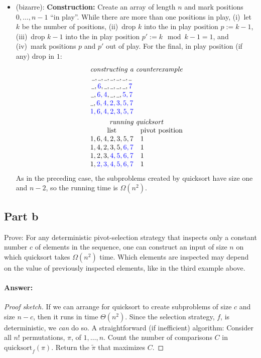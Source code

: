 \documentclass[a4paper]{article}
\newcommand*{\dave}[1]{{\color{red}\textbf{PDS: #1}}}
\begin{document}
\begin{itemize}
	\item (bizarre):
	\textbf{Construction:}
	Create an array of length $n$ and mark positions $0, \ldots, n-1$ ``in play''.
	While there are more than one positions in play,
	(i)~let $k$ be the number of positions,
	(ii)~drop $k$ into the in play position $p := k-1$,
	(iii)~drop $k-1$ into the in play position $p' := k \mod k-1 = 1$, and
	(iv)~mark positions $p$ and $p'$ out of play.
	For the final, in play position (if any) drop in $1$:
	\[
		\begin{array}{cl}
		\multicolumn{2}{c}{\text{\emph{constructing a counterexample}}} \\
		\HOLE, \HOLE, \HOLE, \HOLE, \HOLE, \HOLE, \HOLE \\
		\HOLE, \USED{6}, \HOLE, \HOLE, \HOLE, \HOLE, \USED{7} \\
		\HOLE, \USED{6, 4}, \HOLE, \HOLE, \USED{5, 7} \\
		\HOLE, \USED{6, 4, 2, 3, 5, 7} \\
		\USED{1, 6, 4, 2, 3, 5, 7} \\[\jot]
		\multicolumn{2}{c}{\text{\emph{running quicksort}}} \\
		\text{list} & \text{pivot position} \\
		1, 6, 4, 2, 3, 5, 7 & 1\\
		1, 4, 2, 3, 5, \USED{6, 7} & 1\\
		1, 2, 3, \USED{4, 5, 6, 7} & 1\\
		1, \USED{2, 3, 4, 5, 6, 7} & 1\\
		\end{array}
	\]
	As in the preceding case, the subproblems created by quicksort have size one and $n-2$, so the running time is $\Omega(n^2)$.
\end{itemize}

\subsection{Part b}

Prove: For any deterministic pivot-selection strategy that inspects only a constant number $c$ of elements in the sequence, one can construct an input of size $n$ on which quicksort takes $\Omega(n^2)$ time.
Which elements are inspected may depend on the value of previously inspected elements, like in the third example above.

\paragraph{Answer:}
\begin{proof}[Proof sketch]
If we can arrange for quicksort to create subproblems of size $c$ and size $n-c$, then it runs in time $\Theta(n^2)$.
Since the selection strategy, $f$, is deterministic, we \emph{can} do so.
A straightforward (if inefficient) algorithm:
Consider all $n!$ permutations, $\pi$, of $1, \ldots, n$.
Count the number of comparisons $C$ in $\text{quicksort}_f(\pi)$.
Return the $\tilde \pi$ that maximizes $C$.
\end{proof}
\end{document}

